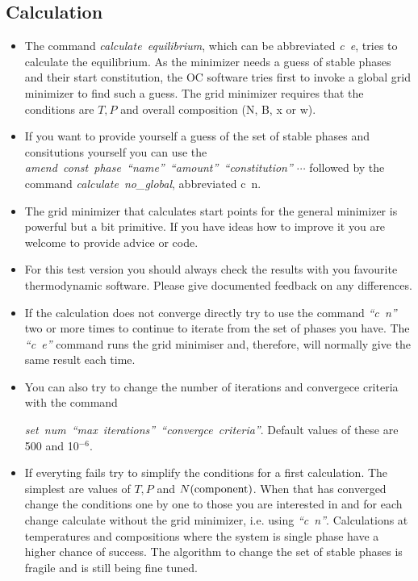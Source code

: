\documentclass[12pt]{article}
\begin{document}
\subsection{Calculation}

\begin{itemize}
\item The command {\em calculate~equilibrium}, which can be
  abbreviated {\em c~e}, tries to calculate the equilibrium.  As the
  minimizer needs a guess of stable phases and their start
  constitution, the OC software tries first to invoke a global grid
  minimizer to find such a guess.  The grid minimizer requires that
  the conditions are $T, P$ and overall composition (N, B, x or w).

\item If you want to provide yourself a guess of the set of stable
  phases and consitutions yourself you can use the {\em
    amend~const~phase~``name''~``amount''~``constitution'' $\cdots$}
  followed by the command {\em calculate~no\_global}, abbreviated {\rm
    c~n}.

\item The grid minimizer that calculates start points for the general
  minimizer is powerful but a bit primitive.  If you have ideas how to
  improve it you are welcome to provide advice or code.

\item For this test version you should always check the results with
  you favourite thermodynamic software.  Please give documented
  feedback on any differences.

\item If the calculation does not converge directly try to use the
  command {\em ``c~n''} two or more times to continue to iterate from
  the set of phases you have.  The {\em ``c~e''} command runs the grid
  minimiser and, therefore, will normally give the same result each
  time.

\item You can also try to change the number of iterations and
  convergece criteria with the command

  {\em set~num~``max~iterations''~``convergce~criteria''}.  Default
  values of these are 500 and 10$^{-6}$.

\item If everyting fails try to simplify the conditions for a first
  calculation.  The simplest are values of $T, P$ and $N(\rm
  component)$. When that has converged change the conditions one by
  one to those you are interested in and for each change calculate
  without the grid minimizer, i.e.  using {\em ``c~n''}.  Calculations
  at temperatures and compositions where the system is single phase
  have a higher chance of success.  The algorithm to change the set of
  stable phases is fragile and is still being fine tuned.


\end{itemize}
\end{document}
